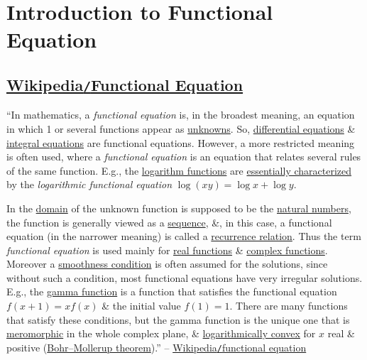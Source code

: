 \documentclass{article}
\begin{document}

\section{Introduction to Functional Equation}

\subsection{\href{https://en.wikipedia.org/wiki/Functional_equation}{Wikipedia\texttt{/}Functional Equation}}
``In mathematics, a \textit{functional equation} is, in the broadest meaning, an equation in which 1 or several functions appear as \href{https://en.wikipedia.org/wiki/Unknown_(mathematics)}{unknowns}. So, \href{https://en.wikipedia.org/wiki/Differential_equation}{differential equations} \& \href{https://en.wikipedia.org/wiki/Integral_equation}{integral equations} are functional equations. However, a more restricted meaning is often used, where a \textit{functional equation} is an equation that relates several rules of the same function. E.g., the \href{https://en.wikipedia.org/wiki/Logarithm_function}{logarithm functions} are \href{https://en.wikipedia.org/wiki/Logarithm#Characterization_by_the_product_formula}{essentially characterized} by the \textit{logarithmic functional equation} $\log(xy) = \log x + \log y$.

In the \href{https://en.wikipedia.org/wiki/Domain_of_a_function}{domain} of the unknown function is supposed to be the \href{https://en.wikipedia.org/wiki/Natural_number}{natural numbers}, the function is generally viewed as a \href{https://en.wikipedia.org/wiki/Sequence_(mathematics)}{sequence}, \&, in this case, a functional equation (in the narrower meaning) is called a \href{https://en.wikipedia.org/wiki/Recurrence_relation}{recurrence relation}. Thus the term \textit{functional equation} is used mainly for \href{https://en.wikipedia.org/wiki/Real_function}{real functions} \& \href{https://en.wikipedia.org/wiki/Complex_function}{complex functions}. Moreover a \href{https://en.wikipedia.org/wiki/Smooth_function}{smoothness condition} is often assumed for the solutions, since without such a condition, most functional equations have very irregular solutions. E.g., the \href{https://en.wikipedia.org/wiki/Gamma_function}{gamma function} is a function that satisfies the functional equation $f(x + 1) = xf(x)$ \& the initial value $f(1) = 1$. There are many functions that satisfy these conditions, but the gamma function is the unique one that is \href{https://en.wikipedia.org/wiki/Meromorphic_function}{meromorphic} in the whole complex plane, \& \href{https://en.wikipedia.org/wiki/Logarithmically_convex_function}{logarithmically convex} for $x$ real \& positive (\href{https://en.wikipedia.org/wiki/Bohr%E2%80%93Mollerup_theorem}{Bohr--Mollerup theorem}).'' -- \href{https://en.wikipedia.org/wiki/Functional_equation}{Wikipedia\texttt{/}functional equation}
\end{document}
